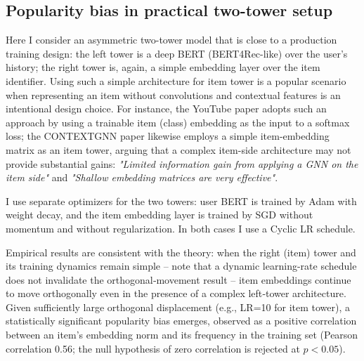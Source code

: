 \subsection{Popularity bias in practical two-tower setup}

Here I consider an asymmetric two-tower model that is close to a production training design: the left tower is a deep BERT (BERT4Rec-like) over the user's history; the right tower is, again, a simple embedding layer over the item identifier. 
Using such a simple architecture for item tower is a popular scenario when representing an item without convolutions and contextual features is an intentional design choice. 
For instance, the YouTube paper adopts such an approach by using a trainable item (class) embedding as the input to a softmax loss; 
the CONTEXTGNN paper likewise employs a simple item-embedding matrix as an item tower, arguing that a complex item-side architecture may not provide substantial gains: \emph{"Limited information gain from applying a GNN on the item side"} and \emph{"Shallow embedding matrices are very effective"}.

I use separate optimizers for the two towers: user BERT is trained by Adam with weight decay, and the item embedding layer is trained by SGD without momentum and without regularization. 
In both cases I use a Cyclic LR schedule. 

Empirical results are consistent with the theory: when the right (item) tower and its training dynamics remain simple -- note that a dynamic learning-rate schedule does not invalidate the orthogonal‑movement result -- item embeddings continue to move orthogonally even in the presence of a complex left‑tower architecture.
Given sufficiently large orthogonal displacement (e.g., LR=10 for item tower), a statistically significant popularity bias emerges, observed as a positive correlation between an item’s embedding norm and its frequency in the training set (Pearson correlation 0.56; the null hypothesis of zero correlation is rejected at $p<0.05$).


